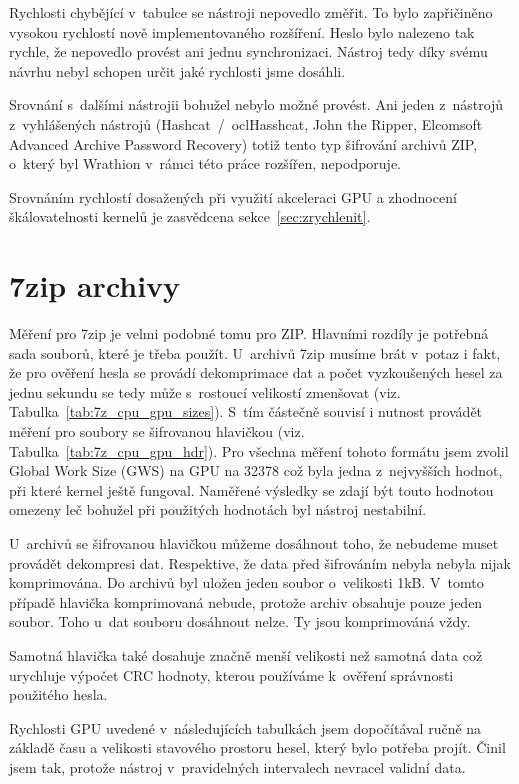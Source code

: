 Rychlosti chybějící v~tabulce se nástroji nepovedlo změřit. To bylo zapřičiněno vysokou rychlostí
nově implementovaného rozšíření. Heslo bylo nalezeno tak rychle, že nepovedlo provést ani jednu
synchronizaci. Nástroj tedy díky svému návrhu nebyl schopen určit jaké rychlosti jsme dosáhli.

Srovnání s~dalšími nástrojii bohužel nebylo možné provést. Ani jeden z~nástrojů z~vyhlášených
nástrojů (Hashcat~/~oclHasshcat, John the Ripper, Elcomsoft Advanced Archive Password Recovery)
totiž tento typ šifrování archivů ZIP, o~který byl Wrathion v~rámci této práce rozšířen,
nepodporuje.

Srovnáním rychlostí dosažených při využití akceleraci GPU a zhodnocení škálovatelnosti kernelů je zasvědcena sekce~\ref{sec:zrychlenit}. 

\section{7zip archivy}
Měření pro 7zip je velmi podobné tomu pro ZIP. Hlavními rozdíly je potřebná sada souborů, které
je třeba použít. U~archivů 7zip musíme brát v~potaz i fakt, že pro ověření hesla se provádí
dekomprimace dat a počet vyzkoušených hesel za jednu sekundu se tedy může s~rostoucí velikostí
zmenšovat (viz. Tabulka~\ref{tab:7z_cpu_gpu_sizes}). S~tím částečně souvisí i nutnost provádět
měření pro soubory se šifrovanou hlavičkou (viz. Tabulka~\ref{tab:7z_cpu_gpu_hdr}). Pro všechna
měření tohoto formátu jsem zvolil Global Work Size (GWS) na GPU na 32378 což byla jedna
z~nejvyšších hodnot, při které kernel ještě fungoval. Naměřené výsledky se zdají být touto hodnotou
omezeny leč bohužel při použitých hodnotách byl nástroj nestabilní.

U~archivů se šifrovanou hlavičkou můžeme dosáhnout toho, že nebudeme muset provádět dekompresi
dat. Respektive, že data před šifrováním nebyla nebyla nijak komprimována. Do archivů byl uložen
jeden soubor o~velikosti 1kB. V~tomto případě hlavička komprimovaná nebude, protože archiv
obsahuje pouze jeden soubor. Toho u~dat souboru dosáhnout nelze. Ty jsou komprimováná vždy.

Samotná hlavička také dosahuje značně menší velikosti než samotná data což urychluje výpočet CRC
hodnoty, kterou používáme k~ověření správnosti použitého hesla.

Rychlosti GPU uvedené v~následujících tabulkách jsem dopočítával ručně na základě času a
velikosti stavového prostoru hesel, který bylo potřeba projít. Činil jsem tak, protože nástroj
v~pravidelných intervalech nevracel validní data.

